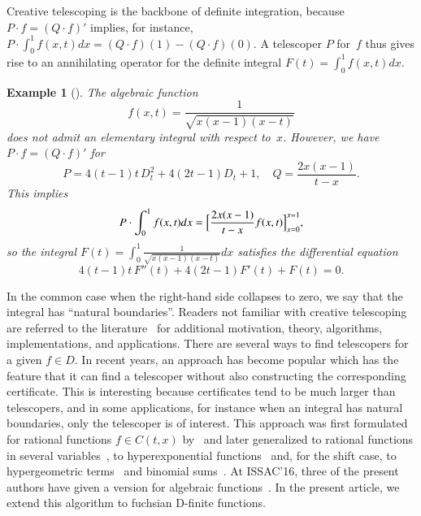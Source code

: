 \documentclass[final,1p,times,authoryear]{elsarticle}
\newtheorem{example}[theorem]{Example}
\begin{document}
Creative telescoping is the backbone of definite integration, because
$P\cdot f=(Q\cdot f)'$ implies, for instance, $P\cdot\int_0^1 f(x,t)dx = (Q\cdot f)(1) - (Q\cdot f)(0)$.
A telescoper $P$ for~$f$ thus gives rise to an annihilating operator for the
definite integral $F(t)=\int_0^1 f(x,t)dx$.
\begin{example}[\citep{manin1958}]
  The algebraic function
  \[
    f(x,t)=\frac1{\sqrt{x(x-1)(x-t)}}
  \]
  does not admit an elementary integral with respect to~$x$.
  However, we have $P\cdot f=(Q\cdot f)'$ for
  \[
    P=4(t-1)t\,D_t^2 + 4(2t-1)D_t+1,\quad Q=\frac{2x(x-1)}{t-x}.
  \]
  This implies
  \[
    P\cdot \int_0^1 f(x,t)dx = \Bigl[\frac{2x(x-1)}{t-x}f(x,t)\Bigr]_{x=0}^{x=1},
  \]
  so the integral $F(t)=\int_0^1\frac1{\sqrt{x(x-1)(x-t)}}dx$ satisfies the differential equation
  \[
    4(t-1)t\,F''(t) + 4(2t-1)F'(t) + F(t) = 0.
  \]
\end{example}
In the common case when the right-hand side
collapses to zero, we say that the integral has ``natural boundaries''. Readers not
familiar with creative telescoping are referred to the
literature~\citep{PWZbook1996,Zeilberger1990c,Zeilberger1991,Zeilberger1990,Koepf1998,kauers11}
for additional motivation, theory, algorithms, implementations, and applications. There are
several ways to find telescopers for a given $f\in D$. In recent years, an
approach has become popular which has the feature that it can find a telescoper
without also constructing the corresponding certificate. This is interesting
because certificates tend to be much larger than telescopers, and in some
applications, for instance when an integral has natural boundaries, only the telescoper is of interest. This approach was first
formulated for rational functions $f\in C(t,x)$ by~\cite{BCCL2010} and later
generalized to rational functions in several variables~\citep{bostan13,lairez16}, to
hyperexponential functions~\citep{bostan13a} and, for the shift case, to hypergeometric
terms~\citep{chen15a,huang16} and binomial sums~\citep{bostan16}.
At ISSAC'16, three of the present authors have given a version for algebraic functions~\citep{chen16}.
In the present article, we extend this algorithm to fuchsian D-finite functions.
\end{document}
